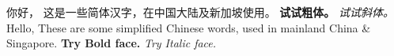 \documentclass{article}
\begin{document}
	\noindent 你好，\newline
	这是一些简体汉字，在中国大陆及新加坡使用。\newline
	\textbf{试试粗体。}\newline
	\textit{试试斜体。}\newline
	\newline
	Hello,\newline
	These are some simplified Chinese words, used in mainland China \& Singapore.\newline
	\textbf{Try Bold face.}\newline
	\textit{Try Italic face.}\newline
\end{document}
